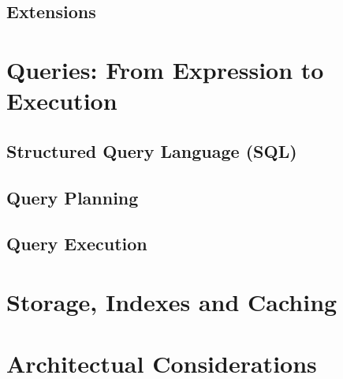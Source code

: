 \subsection{Extensions}

\section{Queries: From Expression to Execution}

\subsection{Structured Query Language (SQL)}

\subsection{Query Planning}

\subsection{Query Execution}

\section{Storage, Indexes and Caching}

\section{Architectual Considerations}